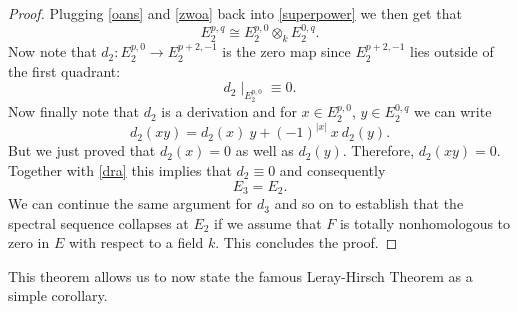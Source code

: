 \documentclass[11pt]{amsart}
\begin{document}
\begin{proof}
    Plugging \ref{oans} and \eqref{zwoa} back into \eqref{superpower} we then get that 
    \begin{equation}\label{dra}
        E_2^{p,q}\cong  E^{p,0}_2 \otimes_k  E^{0, q}_2 .
    \end{equation}
    Now note that $d_2: E_2^{p,0}\to E^{p+2,-1}_2$ is the zero map since $E^{p+2,-1}_2$ lies outside of the first quadrant:
    \begin{equation*}
        d_2\mid_{E^{p,0}_2} \equiv 0.
    \end{equation*}
    Now finally note that $d_2$ is a derivation and  for $x\in E^{p,0}_2$, $y\in E^{0,q}_2$ we can write
    \begin{equation*}
        d_2(xy) = d_2(x)\ y + (-1)^{|x|}\ x\ d_2(y).
    \end{equation*}
    But we just proved that $d_2(x)=0$ as well as $d_2(y)$. Therefore, $d_2(xy) = 0$. Together with \eqref{dra} this implies that $d_2 \equiv 0$ and consequently
    \begin{equation*}
        E_3 = E_2.
    \end{equation*}
    We can continue the same argument for $d_3$ and so on to establish that the spectral sequence collapses at $E_2$ if we assume that $F$ is totally nonhomologous to zero in $E$ with respect to a field $k$. This concludes the proof.
    
    
\end{proof}

This theorem allows us to now state the famous Leray-Hirsch Theorem as a simple corollary.
\end{document}
